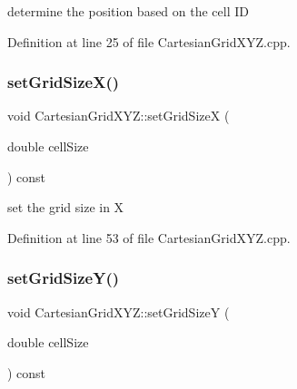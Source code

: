 determine the position based on the cell ID 



Definition at line 25 of file Cartesian\+Grid\+X\+Y\+Z.\+cpp.

\hypertarget{class_d_d4hep_1_1_geometry_1_1_cartesian_grid_x_y_z_acce211d7c69069d7aaeef3673c0765fb}{}\label{class_d_d4hep_1_1_geometry_1_1_cartesian_grid_x_y_z_acce211d7c69069d7aaeef3673c0765fb} 
\subsubsection{\texorpdfstring{set\+Grid\+Size\+X()}{setGridSizeX()}}
{\footnotesize\ttfamily void Cartesian\+Grid\+X\+Y\+Z\+::set\+Grid\+SizeX (\begin{DoxyParamCaption}\item[{double}]{cell\+Size }\end{DoxyParamCaption}) const}



set the grid size in X 



Definition at line 53 of file Cartesian\+Grid\+X\+Y\+Z.\+cpp.

\hypertarget{class_d_d4hep_1_1_geometry_1_1_cartesian_grid_x_y_z_a0cb4f844aec5c850f768b316425f6520}{}\label{class_d_d4hep_1_1_geometry_1_1_cartesian_grid_x_y_z_a0cb4f844aec5c850f768b316425f6520} 
\subsubsection{\texorpdfstring{set\+Grid\+Size\+Y()}{setGridSizeY()}}
{\footnotesize\ttfamily void Cartesian\+Grid\+X\+Y\+Z\+::set\+Grid\+SizeY (\begin{DoxyParamCaption}\item[{double}]{cell\+Size }\end{DoxyParamCaption}) const}



